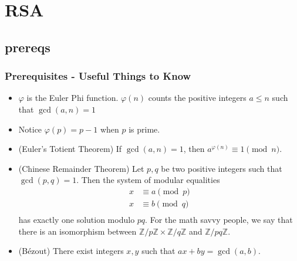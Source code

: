 \documentclass[aspectratio=169,t]{beamer}
\newcommand{\ZZ}{\mathbb{Z}}
\begin{document}
\section{RSA}

\subsection{prereqs}
\begin{frame}
\frametitle{Prerequisites - Useful Things to Know}
\begin{itemize}
\item
$\varphi$ is the Euler Phi function. $\varphi(n)$ counts the positive integers
$a \leq n$ such that $\gcd(a, n) = 1$ \pause
\item
Notice $\varphi(p) = p - 1$ when $p$ is prime. \pause
\item
(Euler's Totient Theorem) If $\gcd(a, n) = 1$, then $a^{\varphi(n)} \equiv 1
\pmod{n}$. \pause
\item
(Chinese Remainder Theorem) Let $p, q$ be two positive integers such that
$\gcd(p, q) = 1$. Then the system of modular equalities
\[ \begin{aligned}
x &\equiv a \pmod{p} \\
x &\equiv b \pmod{q} \\
\end{aligned} \]
has exactly one solution modulo $pq$. For the math savvy people, we say that
there is an isomorphism between $\ZZ/p\ZZ \times \ZZ/q\ZZ$ and $\ZZ/pq\ZZ$.
\pause
\item
(B\'{e}zout) There exist integers $x, y$ such that $ax + by = \gcd(a, b)$.
\end{itemize}
\end{frame}
\end{document}
